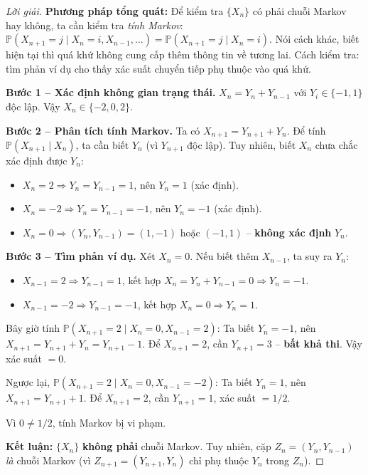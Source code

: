 \documentclass[8pt,a4paper]{article}
\newenvironment{solution}{\begin{proof}[Lời giải]}{\end{proof}}
\newcommand{\prob}{\mathbb{P}}
\begin{document}
\begin{solution}
\textbf{Phương pháp tổng quát:} Để kiểm tra $\{X_n\}$ có phải chuỗi Markov hay không, ta cần kiểm tra \emph{tính Markov}: $\prob(X_{n+1} = j \mid X_n = i, X_{n-1}, \ldots) = \prob(X_{n+1} = j \mid X_n = i)$. Nói cách khác, biết hiện tại thì quá khứ không cung cấp thêm thông tin về tương lai. Cách kiểm tra: tìm phản ví dụ cho thấy xác suất chuyển tiếp phụ thuộc vào quá khứ.

\textbf{Bước 1 -- Xác định không gian trạng thái.}
$X_n = Y_n + Y_{n-1}$ với $Y_i \in \{-1, 1\}$ độc lập. Vậy $X_n \in \{-2, 0, 2\}$.

\textbf{Bước 2 -- Phân tích tính Markov.}
Ta có $X_{n+1} = Y_{n+1} + Y_n$. Để tính $\prob(X_{n+1} \mid X_n)$, ta cần biết $Y_n$ (vì $Y_{n+1}$ độc lập). Tuy nhiên, biết $X_n$ chưa chắc xác định được $Y_n$:
\begin{itemize}
  \item $X_n = 2 \Rightarrow Y_n = Y_{n-1} = 1$, nên $Y_n = 1$ (xác định).
  \item $X_n = -2 \Rightarrow Y_n = Y_{n-1} = -1$, nên $Y_n = -1$ (xác định).
  \item $X_n = 0 \Rightarrow (Y_n, Y_{n-1}) = (1,-1)$ hoặc $(-1,1)$ -- \textbf{không xác định} $Y_n$.
\end{itemize}

\textbf{Bước 3 -- Tìm phản ví dụ.}
Xét $X_n = 0$. Nếu biết thêm $X_{n-1}$, ta suy ra $Y_n$:
\begin{itemize}
  \item $X_{n-1} = 2 \Rightarrow Y_{n-1} = 1$, kết hợp $X_n = Y_n + Y_{n-1} = 0 \Rightarrow Y_n = -1$.
  \item $X_{n-1} = -2 \Rightarrow Y_{n-1} = -1$, kết hợp $X_n = 0 \Rightarrow Y_n = 1$.
\end{itemize}
Bây giờ tính $\prob(X_{n+1} = 2 \mid X_n = 0, X_{n-1} = 2)$: Ta biết $Y_n = -1$, nên $X_{n+1} = Y_{n+1} + Y_n = Y_{n+1} - 1$. Để $X_{n+1} = 2$, cần $Y_{n+1} = 3$ -- \textbf{bất khả thi}. Vậy xác suất $= 0$.

Ngược lại, $\prob(X_{n+1} = 2 \mid X_n = 0, X_{n-1} = -2)$: Ta biết $Y_n = 1$, nên $X_{n+1} = Y_{n+1} + 1$. Để $X_{n+1} = 2$, cần $Y_{n+1} = 1$, xác suất $= 1/2$.

Vì $0 \neq 1/2$, tính Markov bị vi phạm.

\textbf{Kết luận:} $\{X_n\}$ \textbf{không phải} chuỗi Markov. Tuy nhiên, cặp $Z_n = (Y_n, Y_{n-1})$ \emph{là} chuỗi Markov (vì $Z_{n+1} = (Y_{n+1}, Y_n)$ chỉ phụ thuộc $Y_n$ trong $Z_n$).
\end{solution}
\end{document}
